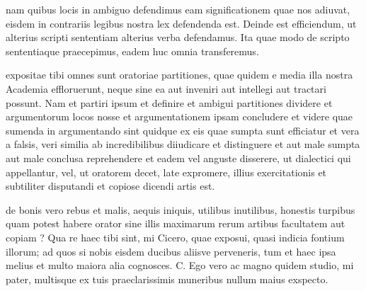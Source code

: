  nam quibus locis in ambiguo defendimus eam significationem quae nos adiuvat, eisdem in contrariis legibus nostra lex defendenda est. Deinde est efficiendum, ut alterius scripti sententiam alterius verba defendamus. Ita quae modo de scripto sententiaque praecepimus, eadem huc omnia transferemus.

 expositae tibi omnes sunt oratoriae partitiones, quae quidem e media illa nostra Academia effloruerunt, neque sine ea aut inveniri aut intellegi aut tractari possunt. Nam et partiri ipsum et definire et ambigui partitiones dividere et argumentorum locos nosse et argumentationem ipsam concludere et videre quae sumenda in argumentando sint quidque ex eis quae sumpta sunt efficiatur et vera a falsis, veri similia ab incredibilibus diiudicare et distinguere et aut male sumpta aut male conclusa reprehendere et eadem vel anguste disserere, ut dialectici qui appellantur, vel, ut oratorem decet, late expromere, illius exercitationis et subtiliter disputandi et copiose dicendi artis est.

 de bonis vero rebus et malis, aequis iniquis, utilibus inutilibus, honestis turpibus quam potest habere orator sine illis maximarum rerum artibus facultatem aut copiam ? Qua re haec tibi sint, mi Cicero, quae exposui, quasi indicia fontium illorum; ad quos si nobis eisdem ducibus aliisve perveneris, tum et haec ipsa melius et multo maiora alia cognosces. C. Ego vero ac magno quidem studio, mi pater, multisque ex tuis praeclarissimis muneribus nullum maius exspecto.
